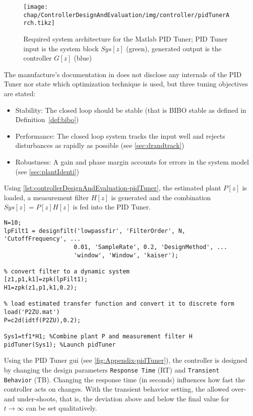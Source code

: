 \begin{figure}[tb]
	\centering
	\texttt{[image: chap/ControllerDesignAndEvaluation/img/controller/pidTunerArch.tikz]}
	\caption[System architecture for the Matlab PID tuner]{Required system architecture for the Matlab PID Tuner; PID Tuner input is the system block $Sys[z]$ (green), generated output is the controller $G[z]$ (blue)}
	\label{fig:controllerDesignAndEvaluation-pidTunersys}
\end{figure}

The manufacture's documentation in \cite{pidTuner} does not disclose any internals of the PID Tuner nor state which optimization technique is used, but three tuning objectives are stated:
\begin{itemize}
\item Stability: The closed loop should be stable (that is BIBO stable as defined in Definition~\ref{def:bibo})
\item Performance: The closed loop system tracks the input well and rejects disturbances as rapidly as possible (see \autoref{sec:drandtrack})
\item Robustness: A gain and phase margin accounts for errors in the system model (see \autoref{sec:plantIdenti})
\end{itemize}

Using \autoref{lst:controllerDesignAndEvaluation-pidTuner}, the estimated plant $P[z]$ is loaded, a measurement filter $H[z]$ is generated and the combination $Sys[z]=P[z]H[z]$ is fed into the PID Tuner.

\begin{lstlisting}[style=matlab,caption = Matlab script to generate an input system for PID Tuner, label = lst:controllerDesignAndEvaluation-pidTuner]
% design lowpass measurement filter H
N=10;
lpFilt1 = designfilt('lowpassfir', 'FilterOrder', N, 'CutoffFrequency', ...
                    0.01, 'SampleRate', 0.2, 'DesignMethod', ...
                    'window', 'Window', 'kaiser');

% convert filter to a dynamic system                
[z1,p1,k1]=zpk(lpFilt1);
H1=zpk(z1,p1,k1,0.2);

% load estimated transfer function and convert it to discrete form
load('P2ZU.mat')
P=c2d(idtf(P2ZU),0.2);

Sys1=tf1*H1; %Combine plant P and measurement filter H
pidTuner(Sys1); %Launch pidTuner
\end{lstlisting}

Using the PID Tuner \gls{gui} (see \autoref{fig:Appendix-pidTuner}), the controller is designed by changing the design parameters \texttt{Response Time} (RT) and \texttt{Transient Behavior} (TB). Changing the response time (in seconds) influences how fast the controller acts on changes. With the transient behavior setting, the allowed over- and under-shoots, that is, the deviation above and below the final value for $t \rightarrow \infty$ can be set qualitatively.

